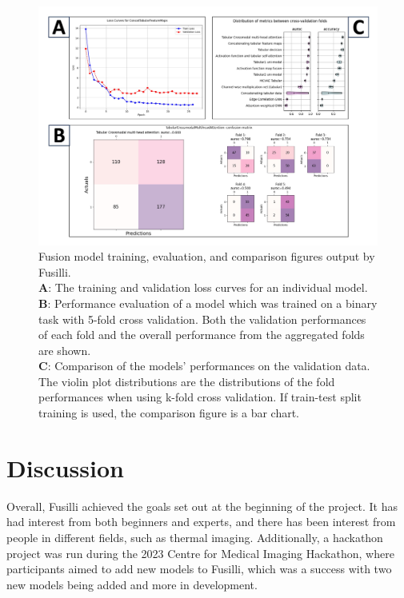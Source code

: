 \begin{figure}
    \centering
    \includegraphics[width=1\linewidth]{figures/fusilli_outputs}
    \caption{Fusion model training, evaluation, and comparison figures output by Fusilli. \\
    \textbf{A}: The training and validation loss curves for an individual model.\\
    \textbf{B}: Performance evaluation of a model which was trained on a binary task with 5-fold cross validation. Both the validation performances of each fold and the overall performance from the aggregated folds are shown. \\
    \textbf{C}: Comparison of the models' performances on the validation data. The violin plot distributions are the distributions of the fold performances when using k-fold cross validation. If train-test split training is used, the comparison figure is a bar chart.
    }
    \label{fig:fusillioutputs}
\end{figure}


\section{Discussion}

Overall, Fusilli achieved the goals set out at the beginning of the project.
It has had interest from both beginners and experts, and there has been interest from people in different fields, such as thermal imaging.
Additionally, a hackathon project was run during the 2023 Centre for Medical Imaging Hackathon, where participants aimed to add new models to Fusilli, which was a success with two new models being added and more in development.

